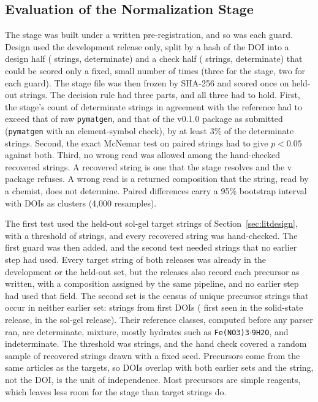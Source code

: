 \documentclass[10pt,journal]{IEEEtran}
\newcommand{\pmg}{\texttt{pymatgen}\xspace}
\begin{document}
\subsection{Evaluation of the Normalization Stage}
\label{sec:stage_design}
The stage was built under a written pre-registration, and so was each guard. Design used the development release only, split by a hash of the DOI into a design half (\StDevHalf{} strings, \StDevHalfDet{} determinate) and a check half (\StDevTestHalf{} strings, \StDevTestHalfDet{} determinate) that could be scored only a fixed, small number of times (three for the stage, two for each guard). The stage file was then frozen by SHA-256 and scored once on held-out strings. The decision rule had three parts, and all three had to hold. First, the stage's count of determinate strings in agreement with the reference had to exceed that of raw \pmg, and that of the v0.1.0 package as submitted (\pmg with an element-symbol check), by at least 3\% of the determinate strings. Second, the exact McNemar test on paired strings had to give $p<0.05$ against both. Third, no wrong read was allowed among the hand-checked recovered strings. A recovered string is one that the stage resolves and the v\ParserVersion{} package refuses. A wrong read is a returned composition that the string, read by a chemist, does not determine. Paired differences carry a 95\% bootstrap interval with DOIs as clusters (4,000 resamples).

The first test used the held-out sol-gel target strings of Section~\ref{sec:litdesign}, with a threshold of \StOneThreshold{} strings, and every recovered string was hand-checked. The first guard was then added, and the second test needed strings that no earlier step had used. Every target string of both releases was already in the development or the held-out set, but the releases also record each precursor as written, with a composition assigned by the same pipeline, and no earlier step had used that field. The second set is the census of unique precursor strings that occur in neither earlier set: \StTwoStrings{} strings from \StTwoDOIs{} first DOIs (\StTwoSolid{} first seen in the solid-state release, \StTwoSolgel{} in the sol-gel release). Their reference classes, computed before any parser ran, are \StTwoDet{} determinate, \StTwoMix{} mixture, mostly hydrates such as \texttt{Fe(NO3)3$\cdot$9H2O}, and \StTwoIndet{} indeterminate. The threshold was \StTwoThreshold{} strings, and the hand check covered a random sample of \StTwoSample{} recovered strings drawn with a fixed seed. Precursors come from the same articles as the targets, so DOIs overlap with both earlier sets and the string, not the DOI, is the unit of independence. Most precursors are simple reagents, which leaves less room for the stage than target strings do.
\end{document}
